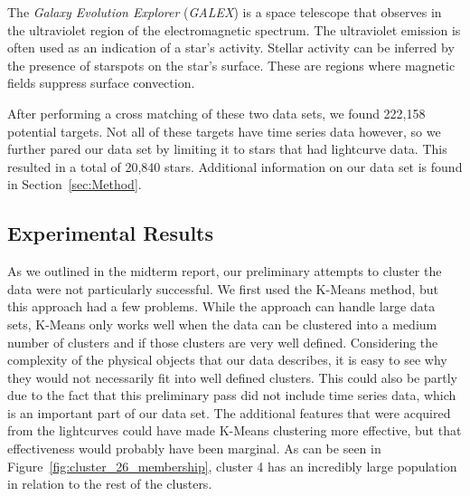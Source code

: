 \documentclass[12pt]{article}
\begin{document}
The \textit{Galaxy Evolution Explorer} (\textit{GALEX}) is a space telescope that observes in the ultraviolet region of the electromagnetic spectrum.
The ultraviolet emission is often used as an indication of a star's activity.
Stellar activity can be inferred by the presence of starspots on the star's surface.
These are regions where magnetic fields suppress surface convection.

After performing a cross matching of these two data sets, we found 222,158 potential targets.
Not all of these targets have time series data however, so we further pared our data set by limiting it to stars that had lightcurve data.
This resulted in a total of 20,840 stars.
Additional information on our data set is found in Section~\ref{sec:Method}.


\subsection{Experimental Results} %
\label{sub:Experimental Results}
As we outlined in the midterm report, our preliminary attempts to cluster the data were not particularly successful.
We first used the K-Means method, but this approach had a few problems.
While the approach can handle large data sets, K-Means only works well when the data can be clustered into a medium number of clusters and if those clusters are very well defined.
Considering the complexity of the physical objects that our data describes, it is easy to see why they would not necessarily fit into well defined clusters.
This could also be partly due to the fact that this preliminary pass did not include time series data, which is an important part of our data set.
The additional features that were acquired from the lightcurves could have made K-Means clustering more effective, but that effectiveness would probably have been marginal.
As can be seen in Figure~\ref{fig:cluster_26_membership}, cluster 4 has an incredibly large population in relation to the rest of the clusters.
\end{document}
